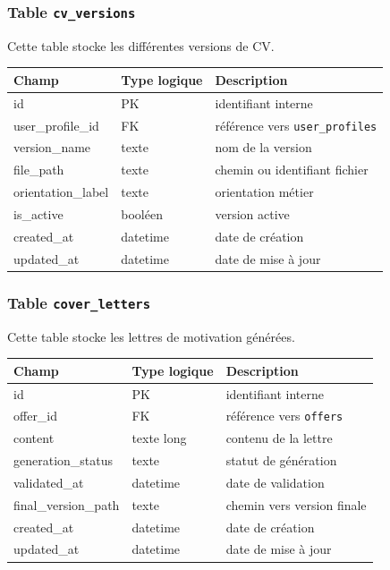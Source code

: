 \documentclass[11pt,a4paper]{article}
\begin{document}
\subsubsection{Table \texttt{cv\_versions}}

Cette table stocke les différentes versions de CV.

\begin{center}
\begin{tabular}{|l|l|l|}
\hline
\textbf{Champ} & \textbf{Type logique} & \textbf{Description} \\
\hline
id & PK & identifiant interne \\
user_profile_id & FK & référence vers \texttt{user\_profiles} \\
version_name & texte & nom de la version \\
file_path & texte & chemin ou identifiant fichier \\
orientation_label & texte & orientation métier \\
is_active & booléen & version active \\
created_at & datetime & date de création \\
updated_at & datetime & date de mise à jour \\
\hline
\end{tabular}
\end{center}

\subsubsection{Table \texttt{cover\_letters}}

Cette table stocke les lettres de motivation générées.

\begin{center}
\begin{tabular}{|l|l|l|}
\hline
\textbf{Champ} & \textbf{Type logique} & \textbf{Description} \\
\hline
id & PK & identifiant interne \\
offer_id & FK & référence vers \texttt{offers} \\
content & texte long & contenu de la lettre \\
generation_status & texte & statut de génération \\
validated_at & datetime & date de validation \\
final_version_path & texte & chemin vers version finale \\
created_at & datetime & date de création \\
updated_at & datetime & date de mise à jour \\
\hline
\end{tabular}
\end{center}
\end{document}
